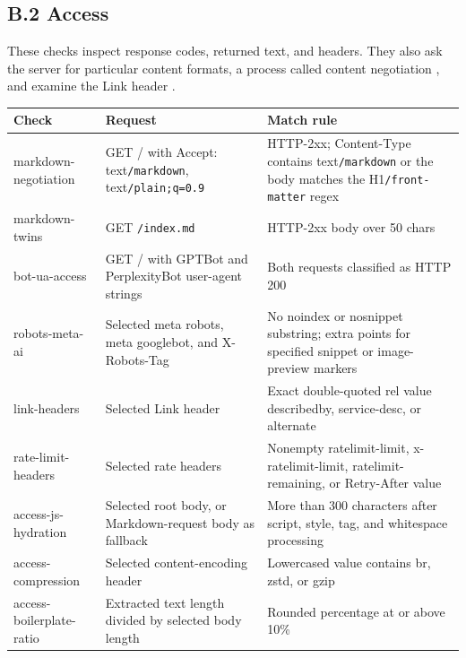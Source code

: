 \documentclass{article}
\begin{document}
\subsection*{B.2 Access}

These checks inspect response codes, returned text, and headers. They also ask the server for particular content formats, a process called content negotiation \cite{ref13}, and examine the Link header \cite{ref14}.

\begingroup
\footnotesize
\setlength{\tabcolsep}{3pt}
\setlength{\LTleft}{0pt}
\setlength{\LTright}{0pt plus 1fill}
\begin{longtable}{>{\raggedright\arraybackslash}p{}>{\raggedright\arraybackslash}p{}>{\raggedright\arraybackslash}p{}}
\toprule
\textbf{Check} & \textbf{Request} & \textbf{Match rule} \\
\midrule
\endhead
markdown-negotiation & GET / with Accept: text\nolinkurl{/markdown}, text\nolinkurl{/plain;q=0.9} & HTTP-2xx; Content-Type contains text\nolinkurl{/markdown} or the body matches the H1\nolinkurl{/front-matter} regex \\
markdown-twins & GET \nolinkurl{/index.md} & HTTP-2xx body over 50 chars \\
bot-ua-access & GET / with GPTBot and PerplexityBot user-agent strings & Both requests classified as HTTP 200 \\
robots-meta-ai & Selected meta robots, meta googlebot, and X-Robots-Tag & No noindex or nosnippet substring; extra points for specified snippet or image-preview markers \\
link-headers & Selected Link header & Exact double-quoted rel value describedby, service-desc, or alternate \\
rate-limit-headers & Selected rate headers & Nonempty ratelimit-limit, x-ratelimit-limit, ratelimit-remaining, or Retry-After value \\
access-js-hydration & Selected root body, or Markdown-request body as fallback & More than 300 characters after script, style, tag, and whitespace processing \\
access-compression & Selected content-encoding header & Lowercased value contains br, zstd, or gzip \\
access-boilerplate-ratio & Extracted text length divided by selected body length & Rounded percentage at or above 10\% \\
\bottomrule
\end{longtable}
\endgroup
\end{document}

